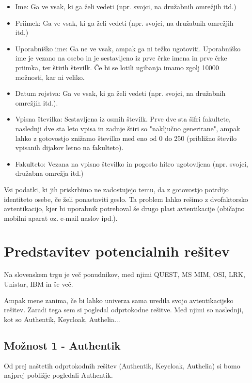 \documentclass[a4paper,12pt,openright]{book}
\begin{document}
\begin{itemize}
    \item Ime: Ga ve vsak, ki ga želi vedeti (npr. svojci, na družabnih omrežjih itd.)
    \item Priimek: Ga ve vsak, ki ga želi vedeti (npr. svojci, na družabnih omrežjih itd.)
    \item Uporabniško ime: Ga ne ve vsak, ampak ga ni težko ugotoviti. Uporabniško ime je vezano na osebo in je sestavljeno iz prve črke imena in prve črke priimka, ter štirih številk. Če bi se lotili ugibanja imamo zgolj 10000 možnosti, kar ni veliko.
    \item Datum rojstva: Ga ve vsak, ki ga želi vedeti (npr. svojci, na družabnih omrežjih itd.).
    \item Vpisna številka: Sestavljena iz osmih številk. Prve dve sta šifri fakultete, naslednji dve sta leto vpisa in zadnje štiri so "naključno generirane", ampak lahko z gotovostjo znižamo številko med eno od 0 do 250 (približno število vpisanih dijakov letno na fakulteto).
    \item Fakulteto: Vezana na vpisno številko in pogosto hitro ugotovljena (npr. svojci, družabna omrežja itd.)
\end{itemize}

Vsi podatki, ki jih priskrbimo ne zadostujejo temu, da z gotovostjo potrdijo identiteto osebe, če želi ponastaviti geslo. Ta problem lahko rešimo z dvofaktorsko avtentikacijo, kjer bi uporabnik potreboval še drugo plast avtentikacije (običajno mobilni aparat oz. e-mail naslov ipd.). 

\section{Predstavitev potencialnih rešitev}

Na slovenskem trgu je več ponudnikov, med njimi QUEST, MS MIM, OSI, LRK, Unistar, IBM in še več.

Ampak mene zanima, če bi lahko univerza sama uredila svojo avtentikacijsko rešitev. Zaradi tega sem si pogledal odprtokodne rešitve. Med njimi so naslednji, kot so Authentik, Keycloak, Authelia...


\subsection{Možnost 1 - Authentik}

Od prej naštetih odprtokodnih rešitev (Authentik, Keycloak, Authelia) si bomo najprej pobližje pogledali Authentik. 
\end{document}

